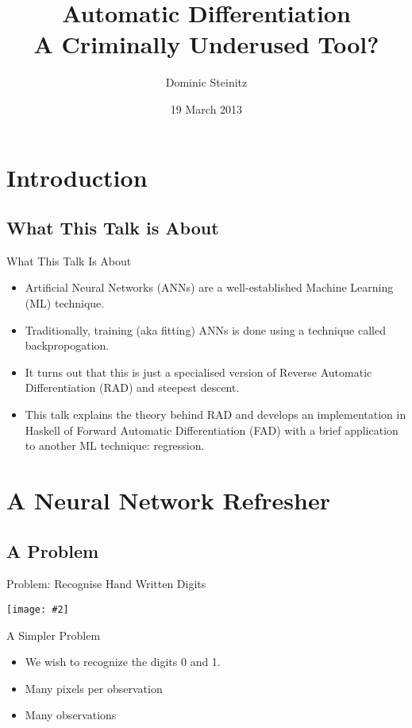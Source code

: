 \documentclass{beamer}
\title[Automatic differentiation]{Automatic Differentiation\\A Criminally Underused Tool?}
\author{Dominic Steinitz}
\institute{Kingston University}
\date{19 March 2013}
\newcommand {\framedgraphic}[2] {
    \begin{frame}{#1}
        \begin{center}
            \texttt{[image: \#2]}
        \end{center}
    \end{frame}
}
\begin{document}
\begin{frame}
\titlepage
\end{frame}

\section{Introduction}

\subsection{What This Talk is About}

\begin{frame}{What This Talk Is About}

  \begin{itemize}
    \pause
  \item Artificial Neural Networks (ANNs) are a well-established
    Machine Learning (ML) technique.
    \pause
  \item Traditionally, training (aka fitting) ANNs is done using a
    technique called backpropogation.
    \pause
  \item It turns out that this is just a specialised version of
    Reverse Automatic Differentiation (RAD) and steepest descent.
    \pause
  \item This talk explains the theory behind RAD and develops an
    implementation in Haskell of Forward Automatic Differentiation
    (FAD) with a brief application to another ML technique:
    regression.
  \end{itemize}

\end{frame}

\section{A Neural Network Refresher}

\subsection{A Problem}

\framedgraphic{Problem: Recognise Hand Written Digits}{diagrams/mnist_originals.png}

\begin{frame}[fragile]{A Simpler Problem}
\begin{itemize}
\item We wish to recognize the digits 0 and 1.
\item Many pixels per observation
\item Many observations
\end{itemize}
\end{frame}
\end{document}

